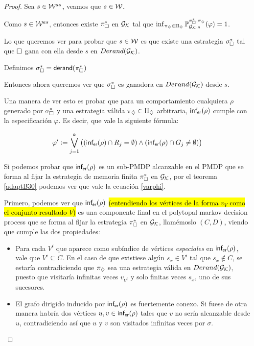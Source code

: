 \begin{proof}
	Sea $s \in \mathcal{W}^{as}$, veamos que $s \in \mathcal{W}$.

	Como $s \in \mathcal{W}^{as}$, entonces existe $\pi_\square^*$ en $\mathcal{G}_{\mathcal{K}}$ tal que
	$\inf_{\pi_\diamondsuit \in \Pi_\diamondsuit}\mathbb{P}_{\mathcal{G}_{\mathcal{K}},s}^{\pi_\square^*, \pi_\diamondsuit}(\varphi) = 1$.

	Lo que queremos ver para probar que $s \in \mathcal{W}$ es que existe una estrategia
	$\sigma_\square^*$ tal que $\square$ gana con ella desde $s$ en $Derand(\mathcal{G}_{\mathcal{K}})$.

	Definimos $\sigma_\square^* = \textsf{derand}(\pi_\square^*)$

	Entonces ahora queremos ver que $\sigma_\square^*$ es ganadora en $Derand(\mathcal{G}_{\mathcal{K}})$ desde
	$s$.

	Una manera de ver esto es probar que para un comportamiento cualquiera $\rho$
	generado por $\sigma_\square^*$ y una estrategia válida $\pi_\diamondsuit \in \Pi_\diamondsuit$
	arbitraria, $\textsf{inf}_\textsf{er}(\rho)$ cumple con la especificación $\varphi$. Es decir, que
	vale la siguiente fórmula:


	\begin{equation}
		\label{varphi}
		\varphi' := \bigvee_{j = 1}^{k} \left((\textsf{inf}_\textsf{er}(\rho) \cap R_j = \emptyset) \wedge (\textsf{inf}_\textsf{er}(\rho) \cap G_j \neq \emptyset)  \right)
	\end{equation}

	Si podemos probar que $\textsf{inf}_\textsf{er}(\rho)$ es un sub-PMDP alcanzable en el PMDP que se
	forma al fijar la estrategia de memoria finita $\pi_\square^*$ en $\mathcal{G}_{\mathcal{K}}$, por el
	teorema \ref{adaptB30} podemos ver que vale la ecuación \ref{varphi}.

	Primero, podemos ver que $\textsf{inf}_\textsf{er}(\rho)$ \hl{(entendiendo los vértices de la
		forma $v_V$ como el conjunto resultado $V$)} es una componente final en el
	polytopal markov decision process que se forma al fijar la estrategia
	$\pi_\square^*$ en $\mathcal{G}_{\mathcal{K}}$, llamémoslo $(C,D)$, viendo que cumple las dos
	propiedades:

	\begin{itemize}
		\item Para cada $V^i$ que aparece como subíndice de vértices \textit{especiales} en
		      $\textsf{inf}_\textsf{er}(\rho)$, vale que $V^i \subseteq C$. En el caso de que existiese algún
		      $s_x \in V^i$ tal que $s_x \notin C$, se estaría contradiciendo que $\pi_\diamondsuit$
		      sea una estrategia válida en $Derand(\mathcal{G}_{\mathcal{K}})$, puesto que visitaría infinitas veces
		      $v_{V^i}$ y solo finitas veces $s_x$, uno de sus sucesores.
		\item El grafo dirigido inducido por $\textsf{inf}_\textsf{er}(\rho)$ es fuertemente conexo. Si fuese de
		      otra manera habría dos vértices $u, v \in \textsf{inf}_\textsf{er}(\rho)$ tales que $v$ no sería
		      alcanzable desde $u$, contradiciendo así que $u$ y $v$ son visitados infinitas
		      veces por $\sigma$.
	\end{itemize}


\end{proof}
